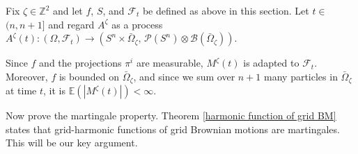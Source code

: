 \documentclass[11pt]{article}
\makeatletter
\renewenvironment{proof}[1][\proofname]{
   \par\pushQED{\qed}\normalfont
   \topsep6\p@\@plus6\p@\relax
   \trivlist\item[\hskip\labelsep\bfseries#1\@addpunct{.}]
   \ignorespaces
}{
   \popQED\endtrivlist\@endpefalse
}
\numberwithin{equation}{section}
\def\AZT{A^{\zeta}(t)}
\def\MZT{M^{\zeta}(t)}
\def\Ex{\mathbb{E}}
\makeatother
\begin{document}
\begin{proof}[Proof of Lemma \ref{lemma M : martingale}]
  Fix $\zeta \in \mathbb{Z}^2$ and let $f$, $S$, and $\mathcal{F}_t$ be defined 
  as above in this section.
  Let $t \in$ \hbox{$(n, n+1]$} and regard $A^{\zeta}$ as a process 
  \mbox{$\AZT : (\Omega, \mathcal{F}_t) \rightarrow 
    (S^{n} \times \bar{\Omega}_{\zeta},\,
    \mathcal{P}(S^{n}) \otimes 
    \mathcal{B}(\bar{\Omega}_{\zeta}) )$. }

  Since $f$ and the projections $\pi^i$ are measurable, 
  $\MZT$ is adapted to $\mathcal{F}_t$.
  Moreover, $f$ is bounded on $\bar{\Omega}_{\zeta}$, 
  and since we sum over $n+1$ many 
  particles in $\bar{\Omega}_{\zeta}$ at time $t$, it is 
  \mbox{$\Ex( |\MZT| ) < \infty$.}

  Now prove the martingale property.
  Theorem \ref{harmonic function of grid BM} states
  that grid-harmonic functions of 
  grid Brownian motions are martingales.
  This will be our key argument. 


\end{proof}
\end{document}
